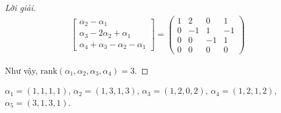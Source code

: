 \documentclass[class=linearalgebra,crop=false]{standalone}
\begin{document}
\begin{proof}[Lời giải]
\begin{align*}
\begin{bmatrix}
            \alpha_{2} - \alpha_{1} \\
            \alpha_{3} - 2\alpha_{2} + \alpha_{1} \\
            \alpha_{4} + \alpha_{3} -\alpha_{2} - \alpha_{1}
        \end{bmatrix}=
        \begin{pmatrix}
            1 & 2 & 0 & 1 \\
            0 & -1 & 1 & -1 \\
            0 & 0 & -1 & 1 \\
            0 & 0 & 0 & 0
        \end{pmatrix}
    \end{align*}
    \par Như vậy, $\text{rank}(\alpha_{1},\alpha_{2},\alpha_{3},\alpha_{4}) = 3$.
\end{proof}

\begin{exercise}
$\alpha_{1} = (1,1,1,1)$, $\alpha_{2} = (1,3,1,3)$, $\alpha_{3} = (1,2,0,2)$, $\alpha_{4} = (1,2,1,2)$, $\alpha_{5} = (3,1,3,1)$.
\end{exercise}
\end{document}
